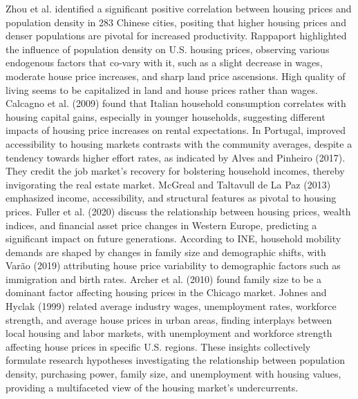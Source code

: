 \documentclass{aip-cp}
\begin{document}
Zhou et al.\cite{article} identified a significant positive correlation between housing prices and population density in 283 Chinese cities, positing that higher housing prices and denser populations are pivotal for increased productivity.
Rappaport\cite{rappaport2008consumption} highlighted the influence of population density on U.S. housing prices, observing various endogenous factors that co-vary with it, such as a slight decrease in wages, moderate house price increases, and sharp land price ascensions. High quality of living seems to be capitalized in land and house prices rather than wages. Calcagno et al. (2009) found that Italian household consumption correlates with housing capital gains, especially in younger households, suggesting different impacts of housing price increases on rental expectations.
In Portugal, improved accessibility to housing markets contrasts with the community averages, despite a tendency towards higher effort rates, as indicated by Alves and Pinheiro (2017). They credit the job market's recovery for bolstering household incomes, thereby invigorating the real estate market. McGreal and Taltavull de La Paz (2013) emphasized income, accessibility, and structural features as pivotal to housing prices.
Fuller et al. (2020) discuss the relationship between housing prices, wealth indices, and financial asset price changes in Western Europe, predicting a significant impact on future generations. According to INE, household mobility demands are shaped by changes in family size and demographic shifts, with Varão (2019) attributing house price variability to demographic factors such as immigration and birth rates. Archer et al. (2010) found family size to be a dominant factor affecting housing prices in the Chicago market.
Johnes and Hyclak (1999) related average industry wages, unemployment rates, workforce strength, and average house prices in urban areas, finding interplays between local housing and labor markets, with unemployment and workforce strength affecting house prices in specific U.S. regions.
These insights collectively formulate research hypotheses investigating the relationship between population density, purchasing power, family size, and unemployment with housing values, providing a multifaceted view of the housing market's undercurrents.
\end{document}
